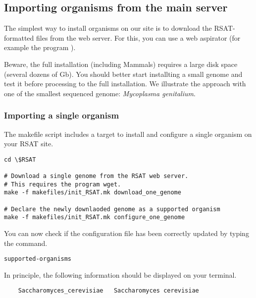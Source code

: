 \subsection{Importing organisms from the \RSAT main server}

The simplest way to install organisms on our \RSAT site is to download
the RSAT-formatted files from the web server. For this, you can use a
web aspirator (for example the program ). 

Beware, the full installation (including Mammals) requires a large
disk space (several dozens of Gb). You should better start installting
a small genome and test it before processing to the full
installation. We illustrate the approach with one of the smallest
sequenced genome: \textit{Mycoplasma genitalium}.

\subsubsection{Importing a single organism}

The makefile script  includes a target to
install and configure a single organism on your RSAT site. 

\begin{small}
\begin{verbatim}
cd \$RSAT

# Download a single genome from the RSAT web server. 
# This requires the program wget.
make -f makefiles/init_RSAT.mk download_one_genome

# Declare the newly downlaoded genome as a supported organism
make -f makefiles/init_RSAT.mk configure_one_genome

\end{verbatim}
\end{small}

You can now check if the configuration file has been correctly updated
by typing the command.

\begin{verbatim}
supported-organisms
\end{verbatim}

In principle, the following information should be displayed on your
terminal.

\begin{small}
\begin{verbatim}
    Saccharomyces_cerevisiae   Saccharomyces cerevisiae
\end{verbatim}
\end{small}


